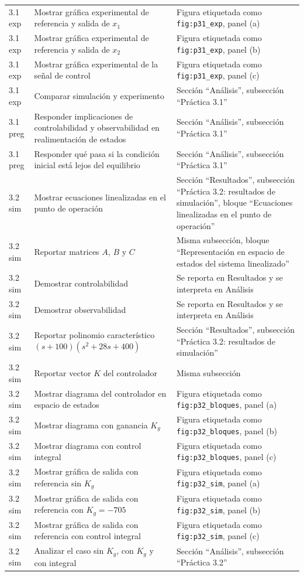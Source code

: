 \documentclass[11pt]{article}
\begin{document}
\begin{longtable}{p{2.2cm} p{8.7cm} p{4.0cm}}
3.1 exp & Mostrar gr\'afica experimental de referencia y salida de $x_1$ & Figura etiquetada como \texttt{fig:p31\_exp}, panel (a) \\
3.1 exp & Mostrar gr\'afica experimental de referencia y salida de $x_2$ & Figura etiquetada como \texttt{fig:p31\_exp}, panel (b) \\
3.1 exp & Mostrar gr\'afica experimental de la se\~nal de control & Figura etiquetada como \texttt{fig:p31\_exp}, panel (c) \\
3.1 exp & Comparar simulaci\'on y experimento & Secci\'on ``An\'alisis'', subsecci\'on ``Pr\'actica 3.1'' \\
3.1 preg & Responder implicaciones de controlabilidad y observabilidad en realimentaci\'on de estados & Secci\'on ``An\'alisis'', subsecci\'on ``Pr\'actica 3.1'' \\
3.1 preg & Responder qu\'e pasa si la condici\'on inicial est\'a lejos del equilibrio & Secci\'on ``An\'alisis'', subsecci\'on ``Pr\'actica 3.1'' \\

3.2 sim & Mostrar ecuaciones linealizadas en el punto de operaci\'on & Secci\'on ``Resultados'', subsecci\'on ``Pr\'actica 3.2: resultados de simulaci\'on'', bloque ``Ecuaciones linealizadas en el punto de operaci\'on'' \\
3.2 sim & Reportar matrices $A$, $B$ y $C$ & Misma subsecci\'on, bloque ``Representaci\'on en espacio de estados del sistema linealizado'' \\
3.2 sim & Demostrar controlabilidad & Se reporta en Resultados y se interpreta en An\'alisis \\
3.2 sim & Demostrar observabilidad & Se reporta en Resultados y se interpreta en An\'alisis \\
3.2 sim & Reportar polinomio caracter\'istico $(s+100)(s^2+28s+400)$ & Secci\'on ``Resultados'', subsecci\'on ``Pr\'actica 3.2: resultados de simulaci\'on'' \\
3.2 sim & Reportar vector $K$ del controlador & Misma subsecci\'on \\
3.2 sim & Mostrar diagrama del controlador en espacio de estados & Figura etiquetada como \texttt{fig:p32\_bloques}, panel (a) \\
3.2 sim & Mostrar diagrama con ganancia $K_g$ & Figura etiquetada como \texttt{fig:p32\_bloques}, panel (b) \\
3.2 sim & Mostrar diagrama con control integral & Figura etiquetada como \texttt{fig:p32\_bloques}, panel (c) \\
3.2 sim & Mostrar gr\'afica de salida con referencia sin $K_g$ & Figura etiquetada como \texttt{fig:p32\_sim}, panel (a) \\
3.2 sim & Mostrar gr\'afica de salida con referencia con $K_g=-705$ & Figura etiquetada como \texttt{fig:p32\_sim}, panel (b) \\
3.2 sim & Mostrar gr\'afica de salida con referencia con control integral & Figura etiquetada como \texttt{fig:p32\_sim}, panel (c) \\
3.2 sim & Analizar el caso sin $K_g$, con $K_g$ y con integral & Secci\'on ``An\'alisis'', subsecci\'on ``Pr\'actica 3.2'' \\


\end{longtable}
\end{document}
